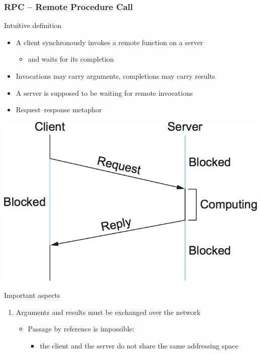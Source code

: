 \documentclass{beamer}\mode<presentation>{\usetheme{AMSBolognaFC}}
\begin{document}
\begin{frame}[allowframebreaks]
    \frametitle{RPC -- Remote Procedure Call}

    \begin{block}{Intuitive definition}
        \begin{itemize}
            \item A client synchronously invokes a remote function on a server
            \begin{itemize}
                \item and waits for its completion
            \end{itemize}

            \item Invocations may carry arguments, completions may carry results

            \item A server is supposed to be waiting for remote invocations

            \item Request--response metaphor
        \end{itemize}
    \end{block}

    \centering

    \includegraphics[width=.8\linewidth]{img/rpc.png}

    \framebreak

    \begin{alertblock}{Important aspects}
        \begin{enumerate}
            \item Arguments and results must be exchanged over the network
            \begin{itemize}
                \item Passage by reference is impossible:
                \begin{itemize}
                    \item the client and the server do not share the same addressing space
                \end{itemize}


\end{itemize}
\end{enumerate}
\end{alertblock}
\end{frame}
\end{document}
